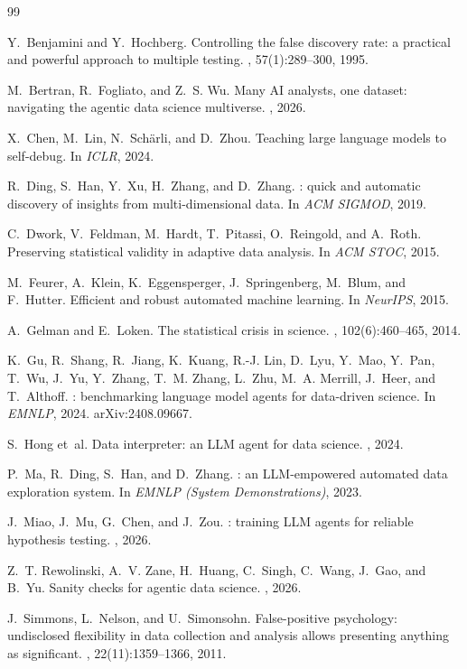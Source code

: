 \documentclass[10pt,twocolumn]{article}
\begin{document}
\begin{thebibliography}{99}\small
\setlength{\itemsep}{0pt}

Y.~Benjamini and Y.~Hochberg.
\newblock Controlling the false discovery rate: a practical and powerful
approach to multiple testing.
, 57(1):289--300, 1995.

M.~Bertran, R.~Fogliato, and Z.~S. Wu.
\newblock Many {AI} analysts, one dataset: navigating the agentic data science
multiverse.
, 2026.

X.~Chen, M.~Lin, N.~Sch\"arli, and D.~Zhou.
\newblock Teaching large language models to self-debug.
\newblock In {\em ICLR}, 2024.

R.~Ding, S.~Han, Y.~Xu, H.~Zhang, and D.~Zhang.
: quick and automatic discovery of insights from
multi-dimensional data.
\newblock In {\em ACM SIGMOD}, 2019.

C.~Dwork, V.~Feldman, M.~Hardt, T.~Pitassi, O.~Reingold, and A.~Roth.
\newblock Preserving statistical validity in adaptive data analysis.
\newblock In {\em ACM STOC}, 2015.

M.~Feurer, A.~Klein, K.~Eggensperger, J.~Springenberg, M.~Blum, and F.~Hutter.
\newblock Efficient and robust automated machine learning.
\newblock In {\em NeurIPS}, 2015.

A.~Gelman and E.~Loken.
\newblock The statistical crisis in science.
, 102(6):460--465, 2014.

K.~Gu, R.~Shang, R.~Jiang, K.~Kuang, R.-J. Lin, D.~Lyu, Y.~Mao, Y.~Pan, T.~Wu,
J.~Yu, Y.~Zhang, T.~M. Zhang, L.~Zhu, M.~A. Merrill, J.~Heer, and T.~Althoff.
: benchmarking language model agents for data-driven science.
\newblock In {\em EMNLP}, 2024. arXiv:2408.09667.

S.~Hong et~al.
\newblock Data interpreter: an {LLM} agent for data science.
, 2024.

P.~Ma, R.~Ding, S.~Han, and D.~Zhang.
: an {LLM}-empowered automated data exploration system.
\newblock In {\em EMNLP (System Demonstrations)}, 2023.

J.~Miao, J.~Mu, G.~Chen, and J.~Zou.
: training {LLM} agents for reliable hypothesis testing.
, 2026.

Z.~T. Rewolinski, A.~V. Zane, H.~Huang, C.~Singh, C.~Wang, J.~Gao, and B.~Yu.
\newblock Sanity checks for agentic data science.
, 2026.

J.~Simmons, L.~Nelson, and U.~Simonsohn.
\newblock False-positive psychology: undisclosed flexibility in data collection
and analysis allows presenting anything as significant.
, 22(11):1359--1366, 2011.

\end{thebibliography}
\end{document}
